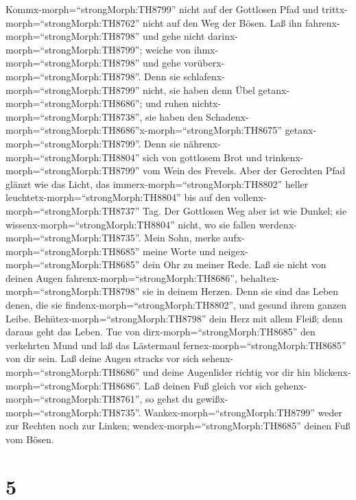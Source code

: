  Kommx-morph=``strongMorph:TH8799'' nicht auf der Gottlosen
Pfad und trittx-morph=``strongMorph:TH8762'' nicht auf den Weg der
Bösen.  Laß ihn fahrenx-morph=``strongMorph:TH8798'' und
gehe nicht darinx-morph=``strongMorph:TH8799''; weiche von
ihmx-morph=``strongMorph:TH8798'' und gehe
vorüberx-morph=``strongMorph:TH8798''.  Denn sie
schlafenx-morph=``strongMorph:TH8799'' nicht, sie haben denn Übel
getanx-morph=``strongMorph:TH8686''; und ruhen
nichtx-morph=``strongMorph:TH8738'', sie haben den
Schadenx-morph=``strongMorph:TH8686''\textbar x-morph=``strongMorph:TH8675''
getanx-morph=``strongMorph:TH8799''.  Denn sie
nährenx-morph=``strongMorph:TH8804'' sich von gottlosem Brot und
trinkenx-morph=``strongMorph:TH8799'' vom Wein des Frevels.
 Aber der Gerechten Pfad glänzt wie das Licht, das
immerx-morph=``strongMorph:TH8802'' heller
leuchtetx-morph=``strongMorph:TH8804'' bis auf den
vollenx-morph=``strongMorph:TH8737'' Tag.  Der Gottlosen
Weg aber ist wie Dunkel; sie wissenx-morph=``strongMorph:TH8804'' nicht,
wo sie fallen werdenx-morph=``strongMorph:TH8735''.  Mein
Sohn, merke aufx-morph=``strongMorph:TH8685'' meine Worte und
neigex-morph=``strongMorph:TH8685'' dein Ohr zu meiner Rede.
 Laß sie nicht von deinen Augen
fahrenx-morph=``strongMorph:TH8686'',
behaltex-morph=``strongMorph:TH8798'' sie in deinem Herzen.
 Denn sie sind das Leben denen, die sie
findenx-morph=``strongMorph:TH8802'', und gesund ihrem ganzen Leibe.
 Behütex-morph=``strongMorph:TH8798'' dein Herz mit allem
Fleiß; denn daraus geht das Leben.  Tue von
dirx-morph=``strongMorph:TH8685'' den verkehrten Mund und laß das
Lästermaul fernex-morph=``strongMorph:TH8685'' von dir sein.
 Laß deine Augen stracks vor sich
sehenx-morph=``strongMorph:TH8686'' und deine Augenlider richtig vor dir
hin blickenx-morph=``strongMorph:TH8686''.  Laß deinen Fuß
gleich vor sich gehenx-morph=``strongMorph:TH8761'', so gehst du
gewißx-morph=``strongMorph:TH8735''. 
Wankex-morph=``strongMorph:TH8799'' weder zur Rechten noch zur Linken;
wendex-morph=``strongMorph:TH8685'' deinen Fuß vom Bösen.

\hypertarget{section-4}{%
\section{5}\label{section-4}}


